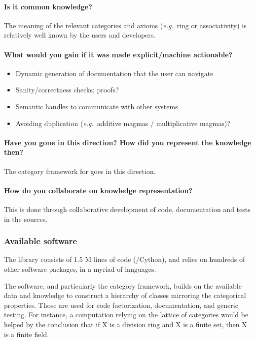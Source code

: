 \paragraph{Is it common knowledge?}

The meaning of the relevant categories and axioms (\emph{e.g.}~ring or associativity) is relatively well known by the users and developers.


\paragraph{What would you gain if it was made explicit/machine actionable?}
\begin{itemize}
\item Dynamic generation of documentation that the user can navigate
\item Sanity/correctness checks; proofs?
\item Semantic handles to communicate with other systems
\item Avoiding duplication (\emph{e.g.}~additive magmas / multiplicative magmas)?
\end{itemize}

\paragraph{Have you gone in this direction? How did you represent the knowledge then?}
The \textsf{category} framework for \SageMath goes in this direction. 

\paragraph{How do you collaborate on knowledge representation?}
This is done through collaborative development of code, documentation and tests in the \SageMath sources. 

\subsubsection{Available software}
The \SageMath library consists of 1.5 M lines of code (\python/Cython), and relies on hundreds of other software packages, in a myriad of languages. 

The software, and particularly the \textsf{category} framework, builds on the available data and knowledge to construct a hierarchy of classes mirroring the categorical properties.  Those are used for code factorization, documentation, and generic testing. For instance, a computation relying on the lattice of categories would be helped by the conclusion that if X is a division ring and X is a finite set, then X is a finite field. 


